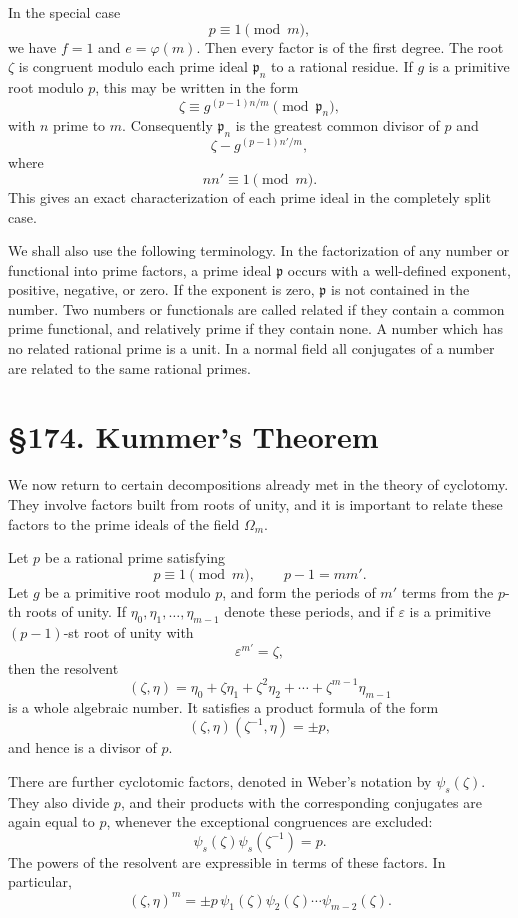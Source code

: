 \documentclass[11pt,a4paper]{book}
\newcommand{\webersection}[2]{\clearpage\section*{\S #1. #2}}
\newcommand{\p}{\mathfrak p}
\begin{document}
In the special case
\[
  p\equiv1\pmod m,
\tag{8}
\]
we have \(f=1\) and \(e=\varphi(m)\).  Then every factor is of the first degree.  The root \(\zeta\) is congruent modulo each prime ideal \(\p_n\) to a rational residue.  If \(g\) is a primitive root modulo \(p\), this may be written in the form
\[
  \zeta\equiv g^{(p-1)n/m}\pmod{\p_n},
\tag{9}
\]
with \(n\) prime to \(m\).  Consequently \(\p_n\) is the greatest common divisor of \(p\) and
\[
  \zeta-g^{(p-1)n'/m},
\tag{10}
\]
where
\[
  nn'\equiv1\pmod m.
\tag{11}
\]
This gives an exact characterization of each prime ideal in the completely split case.

We shall also use the following terminology.  In the factorization of any number or functional into prime factors, a prime ideal \(\p\) occurs with a well-defined exponent, positive, negative, or zero.  If the exponent is zero, \(\p\) is not contained in the number.  Two numbers or functionals are called related if they contain a common prime functional, and relatively prime if they contain none.  A number which has no related rational prime is a unit.  In a normal field all conjugates of a number are related to the same rational primes.

\webersection{174}{Kummer's Theorem}

We now return to certain decompositions already met in the theory of cyclotomy.  They involve factors built from roots of unity, and it is important to relate these factors to the prime ideals of the field \(\Omega_m\).

Let \(p\) be a rational prime satisfying
\[
  p\equiv1\pmod m,\qquad p-1=mm'.
\tag{1}
\]
Let \(g\) be a primitive root modulo \(p\), and form the periods of \(m'\) terms from the \(p\)-th roots of unity.  If \(\eta_0,\eta_1,\ldots,\eta_{m-1}\) denote these periods, and if \(\varepsilon\) is a primitive \((p-1)\)-st root of unity with
\[
  \varepsilon^{m'}=\zeta,
\tag{2}
\]
then the resolvent
\[
  (\zeta,\eta)=\eta_0+\zeta\eta_1+\zeta^2\eta_2+\cdots+\zeta^{m-1}\eta_{m-1}
\tag{3}
\]
is a whole algebraic number.  It satisfies a product formula of the form
\[
  (\zeta,\eta)(\zeta^{-1},\eta)=\pm p,
\tag{4}
\]
and hence is a divisor of \(p\).

There are further cyclotomic factors, denoted in Weber's notation by \(\psi_s(\zeta)\).  They also divide \(p\), and their products with the corresponding conjugates are again equal to \(p\), whenever the exceptional congruences are excluded:
\[
  \psi_s(\zeta)\psi_s(\zeta^{-1})=p.
\tag{5}
\]
The powers of the resolvent are expressible in terms of these factors.  In particular,
\[
  (\zeta,\eta)^m
       =\pm p\,\psi_1(\zeta)\psi_2(\zeta)\cdots\psi_{m-2}(\zeta).
\tag{6}
\]
\end{document}
